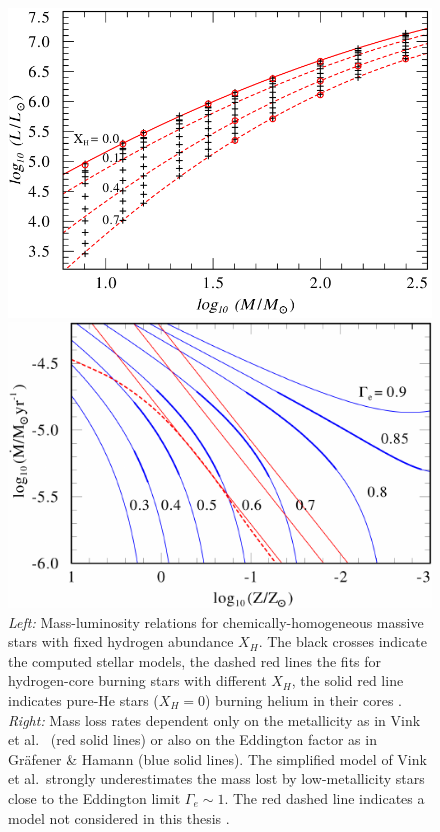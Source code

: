 \documentclass[a4paper,titlepage]{book}     	%
\begin{document}
 
\begin{figure}[h]
	\begin{minipage}{.49\textwidth}
		\centering
		\includegraphics[width=.94\textwidth]{./images/MLrelation.png}
	\end{minipage}
	\hfill
	\begin{minipage}{.49\textwidth}
		\centering
		\includegraphics[width=\textwidth]{./images/stellarwinds.pdf}	
	\end{minipage}
	\caption{\emph{Left:} Mass-luminosity relations for chemically-homogeneous massive stars with fixed hydrogen abundance $X_H$. The black crosses indicate the computed stellar models, the dashed red lines the fits for hydrogen-core burning stars with different $X_H$, the solid red line indicates pure-He stars ($X_H = 0$) burning helium in their cores \cite{Grafener2011_M-L_WR}. \emph{Right:} Mass loss rates dependent only on the metallicity as in Vink et al.\ \cite{Vink2001} (red solid lines) or also on the Eddington factor as in Gr{\"a}fener \& Hamann \cite{G&H_WRmassloss} (blue solid lines). The simplified model of Vink et al.\ strongly underestimates the mass lost by low-metallicity stars close to the Eddington limit $\Gamma_e \sim 1$. The red dashed line indicates a model not considered in this thesis \cite{G&H_WRmassloss}.}\label{fig:MLandwinds}
\end{figure}
\end{document}
